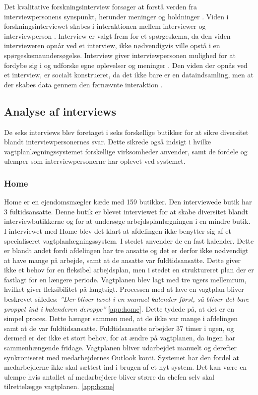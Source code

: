 Det kvalitative forskningsinterview forsøger at forstå verden fra interviewpersonens synspunkt, herunder meninger og holdninger \citep{kvale2009}. Viden i forskningsinterviewet skabes i interaktionen mellem interviewer og interviewperson \citep{kvale2009}. Interview er valgt frem for et spørgeskema, da den viden intervieweren opnår ved et interview, ikke nødvendigvis ville opstå i en spørgeskemaundersøgelse. Interview giver interviewpersonen mulighed for at fordybe sig i og udforske egne oplevelser og meninger \citep{kvale2009}. Den viden der opnås ved et interview, er socialt konstrueret, da det ikke bare er en dataindsamling, men at der skabes data gennem den førnævnte interaktion \citep{kvale2009}.

\subsection{Analyse af interviews}
De seks interviews blev foretaget i seks forskellige butikker for at sikre diversitet blandt interviewpersonernes svar. Dette sikrede også indsigt i hvilke vagtplanlægningssystemet forskellige virksomheder anvender, samt de fordele og ulemper som interviewpersonerne har oplevet ved systemet. 

\subsubsection{Home}
Home er en ejendomsmægler kæde med 159 butikker. Den interviewede butik har 3 fultidsansatte. Denne butik er blevet interviewet for at skabe diversitet blandt interviewbutikkerne og for at undersøge arbejdsplanlægningen i en mindre butik. I interviewet med Home blev det klart at afdelingen ikke benytter sig af  et specialiseret vagtplanlægningssystem. I stedet anvender de en fast kalender. Dette er blandt andet fordi afdelingen har tre ansatte og det er derfor ikke nødvendigt at have mange på arbejde, samt at de ansatte var fuldtidsansatte. Dette giver ikke et behov for en fleksibel arbejdsplan, men i stedet en struktureret plan der er fastlagt for en længere periode. Vagtplanen blev lagt med tre ugers mellemrum, hvilket giver fleksibilitet på langtsigt. Processen med at lave en vagtplan bliver beskrevet således: \textit{”Der bliver lavet i en manuel kalender først, så bliver det bare proppet ind i kalenderen deroppe”} \ref{app:home}. Dette tydede på, at det er en simpel proces. Dette hænger sammen med, at de ikke var mange i afdelingen samt at de var fuldtidsansatte. Fuldtidsansatte arbejder 37 timer i ugen, og dermed er der ikke et stort behov, for at ændre på vagtplanen, da ingen har sammenhængende fridage. Vagtplanen bliver udarbejdet manuelt og derefter synkroniseret med medarbejdernes Outlook konti. Systemet har den fordel at medarbejderne ikke skal sættest ind i brugen af et nyt system. Det kan være en ulempe hvis antallet af medarbejdere bliver større da chefen selv skal tilrettelægge vagtplanen. \ref{app:home}

